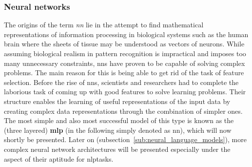\subsubsection{Neural networks}
\label{sub:neural_networks}

The origins of the term \textit{\gls{nn}} lie in the attempt to find mathematical representations of information processing in biological systems such as the human brain where the sheets of tissue may be understood as vectors of neurons. While assuming biological realism in pattern recognition is impractical and imposes too many unnecessary constraints, \gls{nn}s have proven to be capable of solving complex problems. The main reason for this is being able to get rid of the task of feature selection. Before the rise of \gls{nn}s, scientists and researchers had to complete the laborious task of coming up with good features to solve learning problems. Their structure enables the learning of useful representations of the input data by creating complex data representations through the combination of simpler ones. The most simple and also most successful model of this type is known as the (three layered) \textbf{\gls{mlp}} (in the following simply denoted as \gls{nn}), which will now shortly be presented. Later on (subsection~\ref{sub:neural_language_models}), more complex neural network architectures will be presented especially under the aspect of their aptitude for \gls{nlp}tasks.

